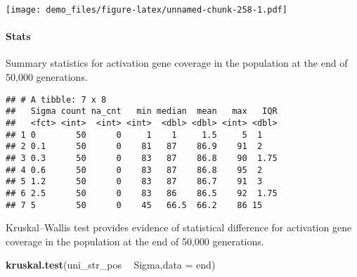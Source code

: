 \documentclass[]{book}
\newenvironment{Shaded}{\begin{snugshade}}{\end{snugshade}}
\newcommand{\DataTypeTok}[1]{\textcolor[rgb]{0.13,0.29,0.53}{#1}}
\newcommand{\KeywordTok}[1]{\textcolor[rgb]{0.13,0.29,0.53}{\textbf{#1}}}
\newcommand{\NormalTok}[1]{#1}
\newcommand{\OperatorTok}[1]{\textcolor[rgb]{0.81,0.36,0.00}{\textbf{#1}}}
\newcommand{\OtherTok}[1]{\textcolor[rgb]{0.56,0.35,0.01}{#1}}
\newcommand{\StringTok}[1]{\textcolor[rgb]{0.31,0.60,0.02}{#1}}
\let\oldparagraph\paragraph
\renewcommand{\paragraph}[1]{\oldparagraph{#1}\mbox{}}
\begin{document}
\texttt{[image: demo\_files/figure-latex/unnamed-chunk-258-1.pdf]}

\hypertarget{stats-49}{%
\paragraph{Stats}\label{stats-49}}

Summary statistics for activation gene coverage in the population at the end of 50,000 generations.

\begin{Shaded}
\end{Shaded}

\begin{verbatim}
## # A tibble: 7 x 8
##   Sigma count na_cnt   min median  mean   max   IQR
##   <fct> <int>  <int> <int>  <dbl> <dbl> <int> <dbl>
## 1 0        50      0     1    1     1.5     5  1   
## 2 0.1      50      0    81   87    86.9    91  2   
## 3 0.3      50      0    83   87    86.8    90  1.75
## 4 0.6      50      0    83   87    86.8    95  2   
## 5 1.2      50      0    83   87    86.7    91  3   
## 6 2.5      50      0    83   86    86.5    92  1.75
## 7 5        50      0    45   66.5  66.2    86 15
\end{verbatim}

Kruskal--Wallis test provides evidence of statistical difference for activation gene coverage in the population at the end of 50,000 generations.

\begin{Shaded}
\begin{Highlighting}[]
\KeywordTok{kruskal.test}\NormalTok{(uni_str_pos }\OperatorTok{~}\StringTok{ }\NormalTok{Sigma,}\DataTypeTok{data =}\NormalTok{ end)}
\end{Highlighting}
\end{Shaded}
\end{document}
